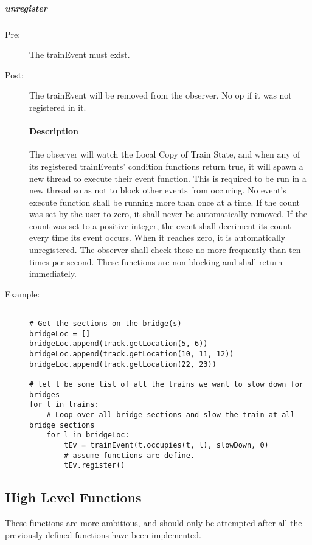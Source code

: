 \documentclass[a4paper,11pt,notitlepage]{article}
\def\LC{Local Copy of Train State\xspace}
\begin{document}
\subparagraph{unregister}
\begin{description}
\item[\hspace{1cm}Pre:] The trainEvent must exist.
\item[\hspace{1cm}Post:] The trainEvent will be removed from the observer. No op if it was not registered in it.
\paragraph{Description}
The observer will watch the \LC, and when any of its registered trainEvents' condition functions return true, it will spawn a new thread to execute their event function. This is required to be run in a new thread so as not to block other events from occuring. No event's execute function shall be running more than once at a time. If the count was set by the user to zero, it shall never be automatically removed. If the count was set to a positive integer, the event shall decriment its count every time its event occurs. When it reaches zero, it is automatically unregistered. The observer shall check these no more frequently than ten times per second.
These functions are non-blocking and shall return immediately.
\item[\hspace{1cm}Example:]
\begin{verbatim}

# Get the sections on the bridge(s)
bridgeLoc = []
bridgeLoc.append(track.getLocation(5, 6))
bridgeLoc.append(track.getLocation(10, 11, 12))
bridgeLoc.append(track.getLocation(22, 23))

# let t be some list of all the trains we want to slow down for bridges
for t in trains:
    # Loop over all bridge sections and slow the train at all bridge sections
    for l in bridgeLoc:
        tEv = trainEvent(t.occupies(t, l), slowDown, 0)
        # assume functions are define.
        tEv.register()
\end{verbatim}
\end{description}


\subsection{High Level Functions}
These functions are more ambitious, and should only be attempted after all the previously defined functions have been implemented.
\end{document}

